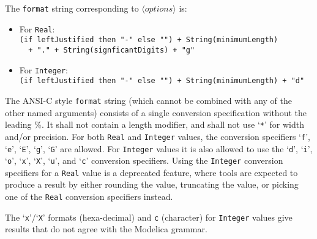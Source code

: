 \begin{operatordefinition*}[String]
\begin{semantics}
The \lstinline!format! string corresponding to $\langle\mathit{options}\rangle$ is:
\begin{itemize}
\item
  For \lstinline!Real!:\\
  \lstinline!(if leftJustified then "-" else "") + String(minimumLength)!\\
  \lstinline!  + "." + String(signficantDigits) + "g"!
\item
  For \lstinline!Integer!:\\
  \lstinline!(if leftJustified then "-" else "") + String(minimumLength) + "d"!
\end{itemize}

The ANSI-C style \lstinline!format! string (which cannot be combined with any of the other named arguments) consists of a single conversion specification without the leading \%.
It shall not contain a length modifier, and shall not use `\lstinline!*!' for width and/or precision.
For both \lstinline!Real! and \lstinline!Integer! values, the conversion specifiers `\lstinline!f!', `\lstinline!e!', `\lstinline!E!', `\lstinline!g!', `\lstinline!G!' are allowed.
For \lstinline!Integer! values it is also allowed to use the `\lstinline!d!', `\lstinline!i!', `\lstinline!o!', `\lstinline!x!', `\lstinline!X!', `\lstinline!u!', and `\lstinline!c!' conversion specifiers.
Using the \lstinline!Integer! conversion specifiers for a \lstinline!Real! value is a deprecated feature, where tools are expected to produce a result by either rounding the value, truncating the value, or picking one of the \lstinline!Real! conversion specifiers instead.

The `\lstinline!x!'/`\lstinline!X!' formats (hexa-decimal) and \lstinline!c! (character) for \lstinline!Integer! values give results that do not agree with the Modelica grammar.


\end{semantics}
\end{operatordefinition*}

